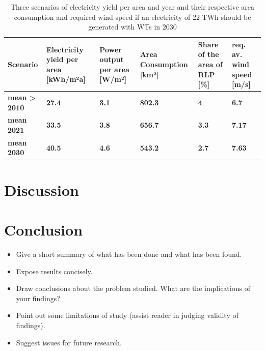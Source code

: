 \documentclass[a4paper,11pt]{article}
\begin{document}
\begin{table}[H]

\caption{\label{tab:table2}Three scenarios of electricity yield per area and year and their respective area consumption 
  and required wind speed if an electricity of 22 TWh should be generated with WTs in 2030}
\centering
\begin{tabular}[t]{>{\raggedright\arraybackslash}p{2.2cm}>{\raggedright\arraybackslash}p{2.2cm}>{\raggedright\arraybackslash}p{2.2cm}>{\raggedright\arraybackslash}p{2.2cm}>{\raggedright\arraybackslash}p{2.2cm}>{\raggedright\arraybackslash}p{2.2cm}}
\toprule
Scenario & Electricity yield per area [kWh/m²a] & Power output per area [W/m²] & Area Consumption [km²] & Share of the area of RLP [\%] & req. av. wind speed [m/s]\\
\midrule
\textbf{mean > 2010} & \textbf{27.4} & \textbf{3.1} & \textbf{802.3} & \textbf{4} & \textbf{6.7}\\
\midrule
\textbf{mean 2021} & \textbf{33.5} & \textbf{3.8} & \textbf{656.7} & \textbf{3.3} & \textbf{7.17}\\
\midrule
\textbf{mean 2030} & \textbf{40.5} & \textbf{4.6} & \textbf{543.2} & \textbf{2.7} & \textbf{7.63}\\
\midrule
\bottomrule
\end{tabular}
\end{table}
\newpage

\hypertarget{discussion}{%
\section{Discussion}\label{discussion}}

\hypertarget{conclusion}{%
\section{Conclusion}\label{conclusion}}
\begin{itemize}
\item
  Give a short summary of what has been done and what has been found.
\item
  Expose results concisely.
\item
  Draw conclusions about the problem studied. What are the implications of your
  findings?
\item
  Point out some limitations of study (assist reader in judging validity of
  findings).
\item
  Suggest issues for future research.
\end{itemize}
\newpage
\end{document}
